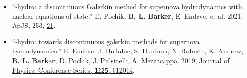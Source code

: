 \documentclass[letterpaper]{deedy-resume} %
\begin{document}
\begin{minipage}[t]{0.63\textwidth}
\begin{itemize}
        \item ``\thornado-hydro: a discontinuous Galerkin method for supernova hydrodynamics with nuclear equations of state.'' D. Pochik, \textbf{B. L. Barker}, E. Endeve, et al. 2021. ApJS, 253, \href{https://iopscience.iop.org/article/10.3847/1538-4365/abd700}{21}.%

        \item ``\thornado-hydro: towards discontinuous galerkin methods for supernova hydrodynamics.'' E. Endeve, J. Buffaloe, S. Dunham, N. Roberts, K. Andrew, \textbf{B. L. Barker}, D. Pochik, J. Pulsinelli, A. Mezzacappa. 2019, \href{https://doi.org/10.1088/1742-6596/1225/1/012014}{Journal of Physics: Conference Series, \texttt{1225}, 012014}.%
   

\end{itemize}


\end{minipage}
\end{document}
